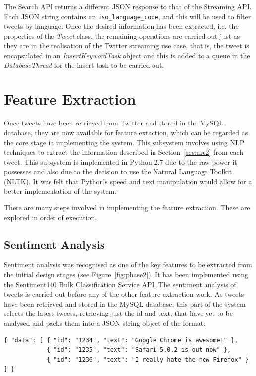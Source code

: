 The Search API returns a different JSON response to that of the Streaming API. Each JSON string contains an \texttt{iso\_language\_code}, and this will be used to filter tweets by language. Once the desired information has been extracted, i.e. the properties of the \emph{Tweet} class, the remaining operations are carried out just as they are in the realisation of the Twitter streaming use case, that is, the tweet is encapsulated in an \emph{InsertKeywordTask} object and this is added to a queue in the \emph{DatabaseThread} for the insert task to be carried out.



\python
\section{Feature Extraction}
\label{sec:fe}
Once tweets have been retrieved from Twitter and stored in the MySQL database, they are now available for feature extaction, which can be regarded as the core stage in implementing the system. This subsystem involves using NLP techniques to extract the information described in Section~\ref{sec:arc2} from each tweet. This subsystem is implemented in Python 2.7 due to the raw power it possesses and also due to the decision to use the Natural Language Toolkit (NLTK). It was felt that Python's speed and text manipulation would allow for a better implementation of the system.

There are many steps involved in implementing the feature extraction. These are explored in order of execution.

\subsection{Sentiment Analysis}
Sentiment analysis was recognised as one of the key features to be extracted from the initial design stages (see Figure~\ref{fig:phase2}). It has been implemented using the Sentiment140 Bulk Classification Service API. 
The sentiment analysis of tweets is carried out before any of the other feature extraction work. As tweets have been retrieved and stored in the MySQL database, this part of the system selects the latest tweets, retrieving just the id and text, that have yet to be analysed and packs them into a JSON string object of the format:

\begin{verbatim}
{ "data": [ { "id": "1234", "text": "Google Chrome is awesome!" },
            { "id": "1235", "text": "Safari 5.0.2 is out now" },
            { "id": "1236", "text": "I really hate the new Firefox" } ] }
\end{verbatim}

